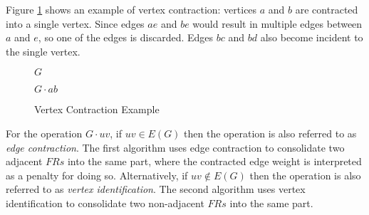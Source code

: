 Figure \ref{fig:contract} shows an example of vertex contraction: vertices \(a\) and \(b\) are contracted into a
single vertex.  Since edges \(ae\) and \(be\) would result in multiple edges between \(a\) and \(e\), so one of the
edges is discarded.  Edges \(bc\) and \(bd\) also become incident to the single vertex.

\begin{figure}[h]
  \label{fig:contract}
  \begin{minipage}{3in}
    \begin{center}

      \bigskip

      \(G\)
    \end{center}
  \end{minipage}
  \begin{minipage}{3in}
    \begin{center} 

      \bigskip

      \(G\cdot ab\)
    \end{center}
  \end{minipage}
  \caption{Vertex Contraction Example}
\end{figure}

For the operation \(G\cdot uv\), if \(uv\in E(G)\) then the operation is also referred to as \emph{edge
  contraction}.  The first algorithm uses edge contraction to consolidate two adjacent \(FRs\) into the same part,
where the contracted edge weight is interpreted as a penalty for doing so.  Alternatively, if \(uv\notin E(G)\)
then the operation is also referred to as \emph{vertex identification}.  The second algorithm uses vertex
identification to consolidate two non-adjacent \(FRs\) into the same part.
